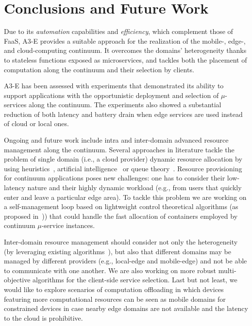 \section{Conclusions and Future Work}\label{sec:conclusions}

Due to its \textit{automation} capabilities and \textit{efficiency}, which complement those of FaaS, A3-E provides a suitable approach for the realization of the mobile-, edge-, and cloud-computing continuum. It overcomes the domains' heterogeneity thanks to stateless functions exposed as microservices, and tackles both the placement of computation along the continuum and their selection by clients.

A3-E has been assessed with experiments that demonstrated its ability to support applications with the opportunistic deployment and selection of $\mu$-services along the continuum.
The experiments also showed a substantial reduction of both latency and battery drain when edge services are used instead of cloud or local ones. 

Ongoing and future work include intra and inter-domain advanced resource management along the continuum. 
Several approaches in literature tackle the problem of single domain (i.e., a cloud provider) dynamic resource allocation by using heuristics~\cite{dustdar0}, artificial intelligence~\cite{ia1} or queue theory~\cite{queue1}. 
Resource provisioning for continuum applications poses new challenges: one has to consider their low-latency nature and their highly dynamic workload (e.g., from users that quickly enter and leave a particular edge area). To tackle this problem we are working on a self-management loop based on lightweight control theoretical algorithms (as proposed in~\cite{Quatrocchi2016discrete})) that could handle the fast allocation of containers employed by continuum $\mu$-service instances. %

Inter-domain resource management should consider not only the heterogeneity (by leveraging existing algorithms~\cite{Tarneberg2017}), but also that different domains may be managed by different providers (e.g., local-edge and mobile-edge) and not be able to communicate with one another. We are also working on more robust multi-objective algorithms for the client-side service selection. 
Last but not least, 
we would like to explore scenarios of computation offloading in which devices featuring more computational resources can be seen as mobile domains for constrained devices in case nearby edge domains are not available and the latency to the cloud is prohibitive.